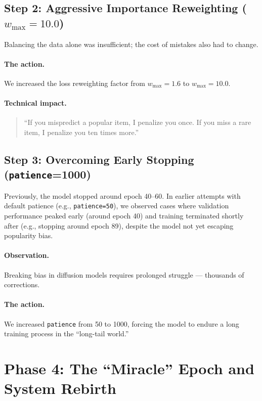 \documentclass[11pt,a4paper]{article}
\begin{document}
\subsection{Step 2: Aggressive Importance Reweighting ($w_{\max}=10.0$)}
Balancing the data alone was insufficient; the cost of mistakes also had to change.

\paragraph{The action.}
We increased the loss reweighting factor from $w_{\max}=1.6$ to $w_{\max}=10.0$.

\paragraph{Technical impact.}
\begin{quote}
``If you mispredict a popular item, I penalize you once.  
If you miss a rare item, I penalize you ten times more.''
\end{quote}

\subsection{Step 3: Overcoming Early Stopping (\texttt{patience}=1000)}
Previously, the model stopped around epoch 40--60. In earlier attempts with default patience (e.g., \texttt{patience=50}), we observed cases where validation performance peaked early (around epoch 40) and training terminated shortly after (e.g., stopping around epoch 89), despite the model not yet escaping popularity bias.

\paragraph{Observation.}
Breaking bias in diffusion models requires prolonged struggle --- thousands of corrections.

\paragraph{The action.}
We increased \texttt{patience} from 50 to 1000, forcing the model to endure a long training process in the ``long-tail world.''

\section{Phase 4: The ``Miracle'' Epoch and System Rebirth}
\end{document}
